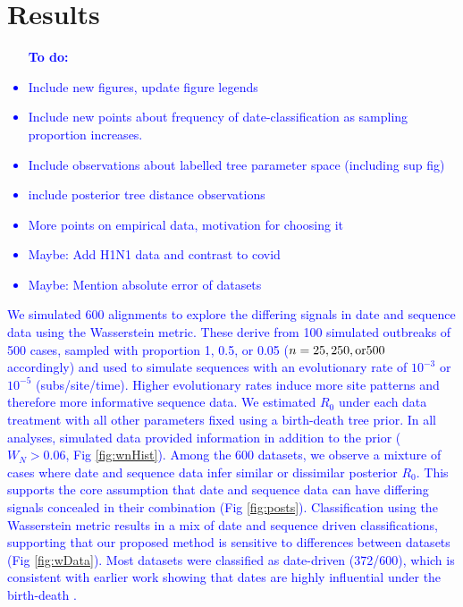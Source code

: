 \documentclass{article}
\begin{document}
\section*{Results}
\textcolor{blue}{\begin{itemize}
    \item [\textbf{To do:}]
    \item Include new figures, update figure legends
    \item Include new points about frequency of date-classification as sampling proportion increases.
    \item Include observations about labelled tree parameter space (including sup fig)
    \item include posterior tree distance observations
    \item More points on empirical data, motivation for choosing it
    \item Maybe: Add H1N1 data and contrast to covid
    \item Maybe: Mention absolute error of datasets
\end{itemize}}
\textcolor{blue}{We simulated 600 alignments to explore the differing signals in date and sequence data using the Wasserstein metric. These derive from 100 simulated outbreaks of 500 cases, sampled with proportion 1, 0.5, or 0.05 ($n = 25, 250, \textnormal{or} 500$ accordingly) and used to simulate sequences with an evolutionary rate of $10^{-3}$ or $10^{-5}$ (subs/site/time). Higher evolutionary rates induce more site patterns and therefore more informative sequence data. We estimated $R_0$ under each data treatment with all other parameters fixed using a birth-death tree prior. In all analyses, simulated data provided information in addition to the prior ($W_{N}>0.06$, Fig \ref{fig:wnHist}). Among the 600 datasets, we  observe a mixture of cases where date and sequence data infer similar or dissimilar posterior $R_{0}$. This supports the core assumption that date and sequence data can have differing signals concealed in their combination (Fig \ref{fig:posts}). Classification using the Wasserstein metric results in a mix of date and sequence driven classifications, supporting that our proposed method is sensitive to differences between datasets (Fig \ref{fig:wData}). Most datasets were classified as date-driven (372/600), which is consistent with earlier work showing that dates are highly influential under the birth-death \citep{volz_sampling_2014}.}
\end{document}
